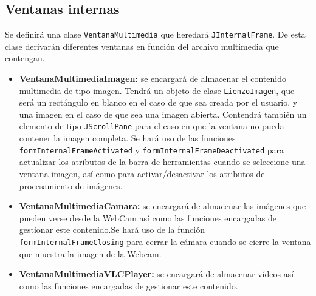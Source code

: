 \subsection{Ventanas internas}
Se definirá una clase \texttt{VentanaMultimedia} que heredará \texttt{JInternalFrame}. De esta clase derivarán diferentes ventanas en función del archivo multimedia que contengan.
\begin{itemize}
\item{\textbf{VentanaMultimediaImagen:} se encargará de almacenar el contenido multimedia de tipo imagen. Tendrá un objeto de clase \texttt{LienzoImagen}, que será un rectángulo en blanco en el caso de que sea creada por el usuario, y una imagen en el caso de que sea una imagen abierta. Contendrá también un elemento de tipo \texttt{JScrollPane} para el caso en que la ventana no pueda contener la imagen completa.\vskip0.3cm Se hará uso de las funciones \texttt{formInternalFrameActivated} y \texttt{formInternalFrameDeactivated} para actualizar los atributos de la barra de herramientas cuando se seleccione una ventana imagen, así como para activar/desactivar los atributos de procesamiento de imágenes.}
\item{\textbf{VentanaMultimediaCamara:} se encargará de almacenar las imágenes que pueden verse desde la WebCam así como las funciones encargadas de gestionar este contenido.Se hará uso de la función \texttt{formInternalFrameClosing} para cerrar la cámara cuando se cierre la ventana que muestra la imagen de la Webcam.}
\item{\textbf{VentanaMultimediaVLCPlayer:} se encargará de almacenar vídeos así como las funciones encargadas de gestionar este contenido.}
\end{itemize}
\vskip0.3cm
